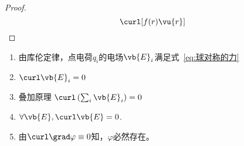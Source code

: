 \begin{proof}
	\begin{equation}
		\curl [ f(r) \vu{r} ]
		\label{eq:球对称的力}
	\end{equation}
\end{proof}
\begin{enumerate}
	\item 由库伦定律，点电荷\( q_i \)的电场\( \vb{E}_i \)满足式~\eqref{eq:球对称的力} 
	\item \( \curl \vb{E}_i = 0 \)
	\item 叠加原理 
		\( \curl \left(\sum_i \vb{E}_i\right) = 0 \)
	\item \( \forall \vb{E}, \curl \vb{E} = 0 \). 
	\item 由\( \curl \grad \varphi \equiv 0 \)知，\( \varphi \)必然存在。
\end{enumerate}




